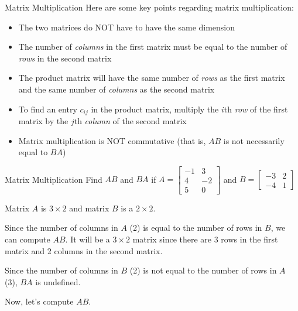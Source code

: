 \documentclass[t]{beamer}
\begin{document}
	\begin{frame}{Matrix Multiplication}
		Here are some key points regarding matrix multiplication: \begin{itemize}
			\item The two matrices do NOT have to have the same dimension
			\item The number of \textit{columns} in the first matrix must be equal to the number of \textit{rows} in the second matrix
			\item The product matrix will have the same number of \textit{rows} as the first matrix and the same number of \textit{columns} as the second matrix
			\item To find an entry $c_{ij}$ in the product matrix, multiply the $i$th \textit{row} of the first matrix by the $j$th \textit{column} of the second matrix
			\item Matrix multiplication is NOT commutative (that is, $AB$ is not necessarily equal to $BA$)
		\end{itemize}
	\end{frame}

	\begin{frame}{Matrix Multiplication}
		Find $AB$ and $BA$ if $A = \begin{bmatrix}
		-1 & 3 \\ 4 & -2 \\ 5 & 0
		\end{bmatrix}$ and $B = \begin{bmatrix}
		-3 & 2 \\ -4 & 1
		\end{bmatrix}$
		
		\pause Matrix $A$ is $3\times 2$ and matrix $B$ is a $2 \times 2$. 
		
		Since the number of columns in $A$ (2) is equal to the number of rows in $B$, we can compute $AB$. It will be a $3 \times 2$ matrix since there are 3 rows in the first matrix and 2 columns in the second matrix. \pause
		
		Since the number of columns in $B$ (2) is not equal to the number of rows in $A$ (3), $BA$ is undefined. \pause
		
		Now, let's compute $AB$.
	\end{frame}
\end{document}
